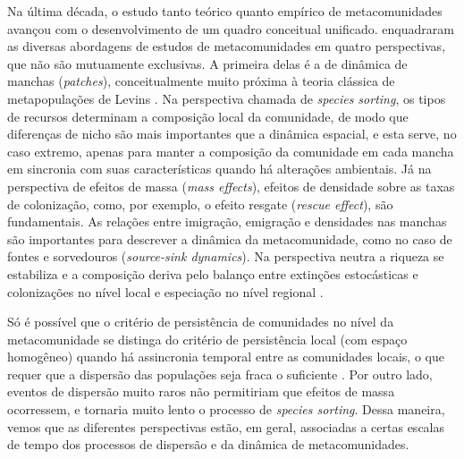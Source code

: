 \documentclass[12pt]{extarticle}
\begin{document}
Na última década, o estudo tanto teórico quanto empírico de metacomunidades
\citep{logue2011} avançou com o desenvolvimento de um
quadro conceitual unificado.  \citet{leibold2004} enquadraram as diversas
abordagens de estudos de metacomunidades em quatro perspectivas, que não são
mutuamente exclusivas. A primeira delas é a de dinâmica de manchas
(\emph{patches}), conceitualmente muito próxima à teoria clássica de
metapopulações de Levins \citep{levins1969,levins1971}. 
Na perspectiva chamada de %
\emph{species sorting}, os tipos de recursos determinam a composição local da comunidade,
de modo que diferenças de nicho são mais importantes que a dinâmica espacial,
e esta serve, no caso extremo, apenas para manter a composição da comunidade em
cada mancha em sincronia com suas características quando há alterações ambientais. 
Já na perspectiva de efeitos de massa
(\emph{mass effects}), efeitos de densidade sobre as taxas de colonização, como, por exemplo, o efeito
resgate (\emph{rescue effect}), são fundamentais. As relações entre imigração, emigração e densidades nas manchas
são importantes para descrever a dinâmica da metacomunidade, como no caso de fontes e sorvedouros (\emph{source-sink dynamics}).
Na perspectiva neutra a riqueza se estabiliza e a composição deriva 
pelo  balanço entre extinções estocásticas e colonizações no nível local 
e especiação no nível regional \citep{hubbell2001}.

Só é possível que o critério de persistência de comunidades no nível da
metacomunidade se distinga do critério de persistência local (com espaço
homogêneo) quando há assincronia temporal entre as comunidades locais, o que
requer que a dispersão das populações seja fraca o suficiente
\citep{chesson1981,amarasekare2003}.
Por outro lado, eventos
de dispersão muito raros não permitiriam que efeitos de massa ocorressem, e
tornaria muito lento o processo de \emph{species sorting}. Dessa maneira,
vemos que as diferentes perspectivas estão, em geral, associadas a certas
escalas de tempo dos processos de dispersão e da dinâmica de metacomunidades.
\end{document}
